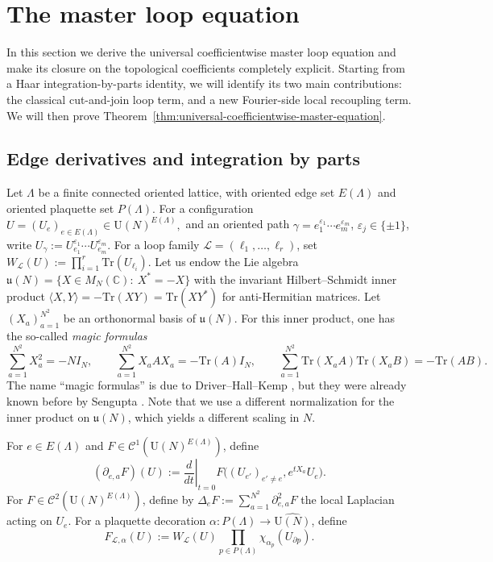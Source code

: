 \documentclass[11pt,a4paper,reqno]{article}
\theoremstyle{definition}
\theoremstyle{remark}
\newcommand\U{{\mathrm U}}
\newcommand\C{\mathbb{C}}
\newcommand\Tr{\mathrm{Tr}}
\newcommand\Lc{{\mathcal{L}}}
\begin{document}
\section{The master loop equation}\label{sec:master-loop}

In this section we derive the universal coefficientwise master loop equation and make its closure on the topological coefficients completely explicit. Starting from a Haar integration-by-parts identity, we will identify its two main contributions: the classical cut-and-join loop term, and a new Fourier-side local recoupling term. We will then prove Theorem~\ref{thm:universal-coefficientwise-master-equation}.

\subsection{Edge derivatives and integration by parts}

Let $\Lambda$ be a finite connected oriented lattice, with oriented edge set $E(\Lambda)$ and oriented plaquette set $P(\Lambda)$. For a configuration $U=(U_e)_{e\in E(\Lambda)}\in\U(N)^{E(\Lambda)},$ and an oriented path $\gamma=e_1^{\varepsilon_1}\cdots e_m^{\varepsilon_m}$, $\varepsilon_j\in\{\pm1\}$, write $U_\gamma:=U_{e_1}^{\varepsilon_1}\cdots U_{e_m}^{\varepsilon_m}.$ For a loop family $\Lc=(\ell_1,\dots,\ell_r)$, set $W_{\Lc}(U):=\prod_{i=1}^r \Tr(U_{\ell_i}).$ Let us endow the Lie algebra $\mathfrak u(N)=\{X\in M_N(\C):\ X^*=-X\}$ with the invariant Hilbert--Schmidt inner product $\langle X,Y\rangle=-\Tr(XY)=\Tr(XY^*)$ for anti-Hermitian matrices. Let $(X_a)_{a=1}^{N^2}$ be an orthonormal basis of $\mathfrak u(N)$. For this inner product, one has the so-called \emph{magic formulas}
\begin{equation}\label{eq:magic}
\sum_{a=1}^{N^2}X_a^2=-NI_N,\qquad \sum_{a=1}^{N^2} X_aAX_a=-\Tr(A)I_N,\qquad \sum_{a=1}^{N^2} \Tr(X_aA)\Tr(X_aB)=-\Tr(AB).
\end{equation}
The name ``magic formulas'' is due to Driver--Hall--Kemp \cite{DHK13}, but they were already known before by Sengupta \cite{Sen08}. Note that we use a different normalization for the inner product on $\mathfrak u(N)$, which yields a different scaling in $N$.

For $e\in E(\Lambda)$ and $F\in \mathscr{C}^1(\U(N)^{E(\Lambda)})$, define
\[
(\partial_{e,a}F)(U):=\left.\frac{d}{dt}\right|_{t=0} F\bigl((U_{e'})_{e'\neq e}, e^{tX_a}U_e\bigr).
\]
For $F\in \mathscr{C}^2(\U(N)^{E(\Lambda)})$, define by $\Delta_e F:=\sum_{a=1}^{N^2}\partial_{e,a}^2 F$ the local Laplacian acting on $U_e$. For a plaquette decoration $\alpha:P(\Lambda)\to \widehat{\U(N)}$, define
\[
F_{\Lc,\alpha}(U):=W_{\Lc}(U)\prod_{p\in P(\Lambda)} \chi_{\alpha_p}(U_{\partial p}).
\]
\end{document}
